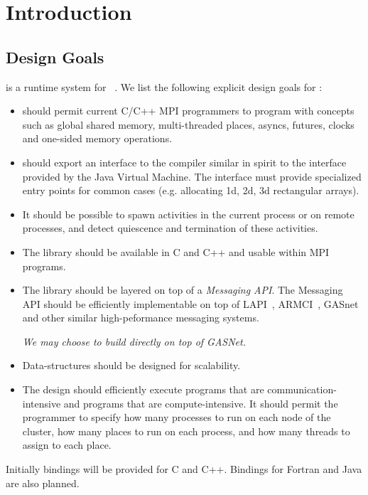 \section{Introduction}
\subsection{Design Goals}
\Xtenlib{} is a runtime system for \Xten{}~\cite{x10}. 
We list the following explicit design goals for \Xtenlib:
\begin{itemize}
{}\item \Xtenlib{} should permit current C/C++ MPI programmers to
 program with \Xten{} concepts such as global shared memory,
 multi-threaded places, asyncs, futures, clocks and one-sided memory
 operations.

 {}\item \Xtenlib{} should export an interface to the compiler
 similar in spirit to the interface provided by the Java Virtual
 Machine. The interface must provide specialized entry points for
 common cases (e.g.{} allocating 1d, 2d, 3d rectangular arrays).

\item It should be possible to spawn activities in the current 
  process or on remote processes, and detect quiescence and
  termination of these activities.

{}\item The library should be available in C and C++ and usable within
MPI programs.

{}\item The library should be layered on top of a {\em Messaging API}.
  The Messaging API should be efficiently implementable on top of
  LAPI~\cite{lapi}, ARMCI~\cite{armci}, GASnet~\cite{gasnet} and other
  similar high-peformance messaging systems.

  {\em We may choose to build directly on top of GASNet.}

\item Data-structures should be designed for scalability.

\item The design should efficiently execute programs that are 
 communication-intensive and programs that are compute-intensive. It
 should permit the programmer to specify how many processes to run on
 each node of the cluster, how many places to run on each process, and
 how many threads to assign to each place.
\end{itemize}
Initially bindings will be provided for C and C++. Bindings for Fortran
and Java are also planned.

